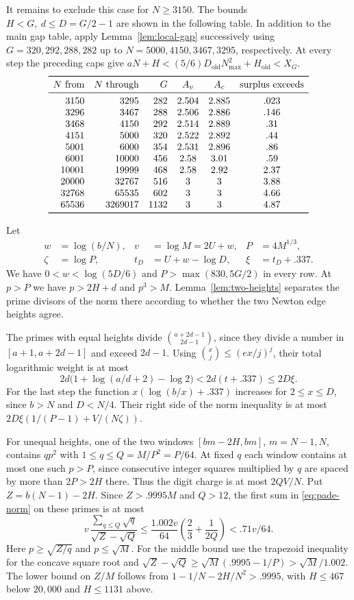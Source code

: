 It remains to exclude this case for \(N\ge3150\).
The bounds \(H<G,\ d\le D=G/2-1\) are shown in the
following table. In addition to the main gap table, apply
Lemma~\ref{lem:local-gap} successively using \(G=320,292,288,282\)
up to \(N=5000,4150,3467,3295\), respectively.
At every step the preceding caps give
\(aN+H<(5/6)D_{\mathrm{old}}N_{\max}^2+H_{\mathrm{old}}<X_G\).
\[
\begin{array}{rrrccc}
\toprule
N\text{ from}&N\text{ through}&G&A_v&A_c&\text{surplus exceeds}\\
\midrule
3150  &3295   &282 &2.504&2.885&.023\\
3296  &3467   &288 &2.506&2.886&.146\\
3468  &4150   &292 &2.514&2.889&.31\\
4151  &5000   &320 &2.522&2.892&.44\\
5001  &6000   &354 &2.531&2.896&.86\\
6001  &10000  &456 &2.58 &3.01 &.59\\
10001 &19999  &468 &2.58 &2.92 &2.37\\
20000 &32767  &516 &3&3&3.88\\
32768 &65535  &602 &3&3&4.66\\
65536 &3269017&1132&3&3&4.87\\
\bottomrule
\end{array}
\]

Let
\[
 \begin{aligned}
 w&=\log(b/N), & v&=\log M=2U+w, & P&=4M^{1/3},\\
 \zeta&=\log P, & t_D&=U+w-\log D, & \xi&=t_D+.337.
 \end{aligned}
\]
We have \(0<w<\log(5D/6)\) and \(P>\max(830,5G/2)\)
in every row. At \(p>P\) we have \(p>2H+d\) and \(p^3>M\).
Lemma~\ref{lem:two-heights} separates the prime divisors of the
norm there according to whether the two Newton edge heights agree.

The primes with equal heights divide
\(\binom{a+2d-1}{2d-1}\), since they divide a number in
\([a+1,a+2d-1]\) and exceed \(2d-1\).
Using \(\binom{x}{j}\le(ex/j)^j\), their total logarithmic weight
is at most
\[
 2d\bigl(1+\log(a/d+2)-\log2\bigr)<2d(t+.337)\le2D\xi.
\]
For the last step the function \(x(\log(b/x)+.337)\) increases
for \(2\le x\le D\), since \(b>N\) and \(D<N/4\).
Their right side of the norm inequality is at most
\(2D\xi(1/(P-1)+V/(N\zeta))\).

For unequal heights, one of the two windows
\([bm-2H,bm]\), \(m=N-1,N\), contains \(qp^2\)
with \(1\le q\le Q=M/P^2=P/64\).
At fixed \(q\) each window contains at most one such \(p>P\),
since consecutive integer squares multiplied by \(q\) are
spaced by more than \(2P>2H\) there.
Thus the digit charge is at most \(2QV/N\).
Put \(Z=b(N-1)-2H\). Since \(Z>.9995M\) and \(Q>12\),
the first sum in \eqref{eq:pade-norm} on these primes is at most
\[
 v\,\frac{\sum_{q\le Q}\sqrt q}{\sqrt Z-\sqrt Q}
 \le \frac{1.002v}{64}\left(\frac23+\frac{1}{2Q}\right)
 < .71v/64.
\]
Here \(p\ge\sqrt{Z/q}\) and \(p\le\sqrt M\).
For the middle bound use the trapezoid inequality for the concave
square root and
\(\sqrt Z-\sqrt Q\ge\sqrt M(.9995-1/P)>\sqrt M/1.002\).
The lower bound on \(Z/M\) follows from
\(1-1/N-2H/N^2>.9995\), with \(H\le467\) below
\(20{,}000\) and \(H\le1131\) above.

